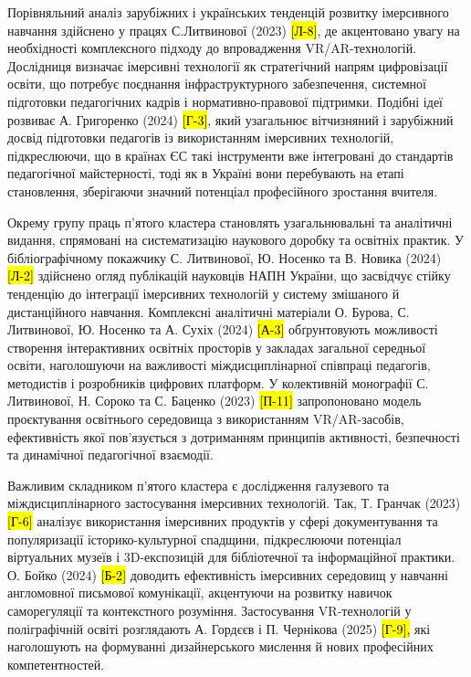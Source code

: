 Порівняльний аналіз зарубіжних і українських тенденцій розвитку імерсивного навчання здійснено у працях С.Литвинової (2023) \hl{{[}Л-8{]}}, де акцентовано увагу на необхідності комплексного підходу до впровадження VR/AR-технологій. Дослідниця визначає імерсивні технології як стратегічний напрям цифровізації освіти, що потребує поєднання інфраструктурного забезпечення, системної підготовки педагогічних кадрів і нормативно-правової підтримки. Подібні ідеї розвиває А. Григоренко (2024) \hl{{[}Г-3{]}}, який узагальнює вітчизняний і зарубіжний досвід підготовки педагогів із використанням імерсивних технологій, підкреслюючи, що в країнах ЄС такі інструменти вже інтегровані до стандартів педагогічної майстерності, тоді як в Україні вони перебувають на етапі становлення, зберігаючи значний потенціал професійного зростання вчителя.

Окрему групу праць п'ятого кластера становлять узагальнювальні та аналітичні видання, спрямовані на систематизацію наукового доробку та освітніх практик. У бібліографічному покажчику С. Литвинової, Ю. Носенко та В. Новика (2024) \hl{{[}Л-2{]}} здійснено огляд публікацій науковців НАПН України, що засвідчує стійку тенденцію до інтеграції імерсивних технологій у систему змішаного й дистанційного навчання. Комплексні аналітичні матеріали О. Бурова, С. Литвинової, Ю. Носенко та А. Сухіх (2024) \hl{{[}А-3{]}} обґрунтовують можливості створення інтерактивних освітніх просторів у закладах загальної середньої освіти, наголошуючи на важливості міждисциплінарної співпраці педагогів, методистів і розробників цифрових платформ. У колективній монографії С. Литвинової, Н. Сороко та С. Баценко (2023) \hl{{[}П-11{]}} запропоновано модель проєктування освітнього середовища з використанням VR/AR-засобів, ефективність якої пов'язується з дотриманням принципів активності, безпечності та динамічної педагогічної взаємодії.

Важливим складником п'ятого кластера є дослідження галузевого та міждисциплінарного застосування імерсивних технологій. Так, Т. Гранчак (2023) \hl{{[}Г-6{]}} аналізує використання імерсивних продуктів у сфері документування та популяризації історико-культурної спадщини, підкреслюючи потенціал віртуальних музеїв і 3D-експозицій для бібліотечної та інформаційної практики. О. Бойко (2024) \hl{{[}Б-2{]}} доводить ефективність імерсивних середовищ у навчанні англомовної письмової комунікації, акцентуючи на розвитку навичок саморегуляції та контекстного розуміння. Застосування VR-технологій у поліграфічній освіті розглядають А. Гордєєв і П. Чернікова (2025) \hl{{[}Г-9{]},} які наголошують на формуванні дизайнерського мислення й нових професійних компетентностей.

